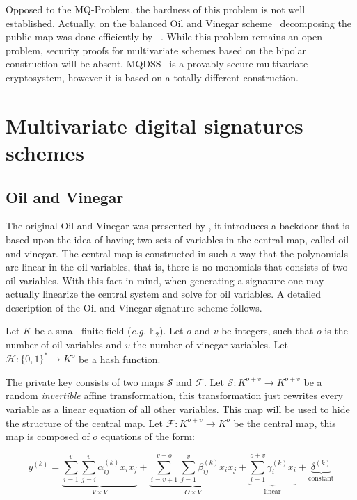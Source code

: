 \documentclass{ufsctex/ufsctex}
\begin{document}
Opposed to the MQ-Problem, the hardness of this problem is not well
established. Actually, on the balanced Oil and Vinegar
scheme~\cite{patarin1997ov} decomposing the public map was done efficiently by
~\cite{kipnis1998cryptanalysis}. While this problem remains an open problem,
security proofs for multivariate schemes based on the bipolar construction will
be absent. MQDSS~\cite{chen20165} is a provably secure multivariate cryptosystem,
however it is based on a totally different construction.

\section{Multivariate digital signatures schemes}

\subsection{Oil and Vinegar}\label{sec:ov}

The original Oil and Vinegar was presented by \cite{patarin1997ov}, it
introduces a backdoor that is based upon the idea of having two sets of
variables in the central map, called oil and vinegar. The central map is
constructed in such a way that the polynomials are linear in the oil variables,
that is, there is no monomials that consists of two oil variables. With this
fact in mind, when generating a signature one may actually linearize the
central system and solve for oil variables. A detailed description of the Oil
and Vinegar signature scheme follows.

Let $K$ be a small finite field (\textit{e.g.} $\mathbb{F}_2$). Let $o$ and $v$
be integers, such that $o$ is the number of oil variables and $v$ the number of
vinegar variables. Let $\mathcal{H}: \{0,1\}^* \to K^o$ be a hash function.

The private key consists of two maps $\mathcal{S}$ and $\mathcal{F}$. Let
$\mathcal{S}: K^{o+v} \to K^{o+v}$ be a random \textit{invertible} affine
transformation, this transformation just rewrites every variable as a linear
equation of all other variables. This map will be used to hide the structure of
the central map. Let $\mathcal{F}: K^{o+v} \to K^{o}$ be the central map, this
map is composed of $o$ equations of the form:

\begin{equation}\label{eq:ovpolynomial}
y^{(k)} =
\underbrace{\sum_{i=1}^{v}\sum_{j=i}^{v} \alpha^{(k)}_{ij} x_i x_j}_{
V \times V} +
\underbrace{\sum_{i=v+1}^{v+o}\sum_{j=1}^{v} \beta^{(k)}_{ij} x_i x_j}_{
O \times V} +
\underbrace{\sum_{i=1}^{o+v} \gamma^{(k)}_{i} x_i}_{\text{linear}} +
\underbrace{\delta^{(k)}}_{\text{constant}}
\end{equation}
\end{document}

